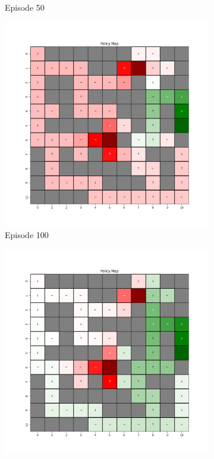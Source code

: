 \documentclass{assignment}
\begin{document}
\begin{figure}[H]
\begin{subfigure}{0.3\textwidth}
    \caption{Episode 50}
    \end{subfigure}\hfill
    \begin{subfigure}{0.3\textwidth}
        \includegraphics[width=\textwidth]{figures/policy_td/default/policy_alpha_0.1_gamma_0.95_epsilon_0.2_iteration_100.png}
    \caption{Episode 100}
    \end{subfigure}
    \begin{subfigure}{0.3\textwidth}
        \includegraphics[width=\textwidth]{figures/policy_td/default/policy_alpha_0.1_gamma_0.95_epsilon_0.2_iteration_1000.png}

\end{subfigure}
\end{figure}
\end{document}
